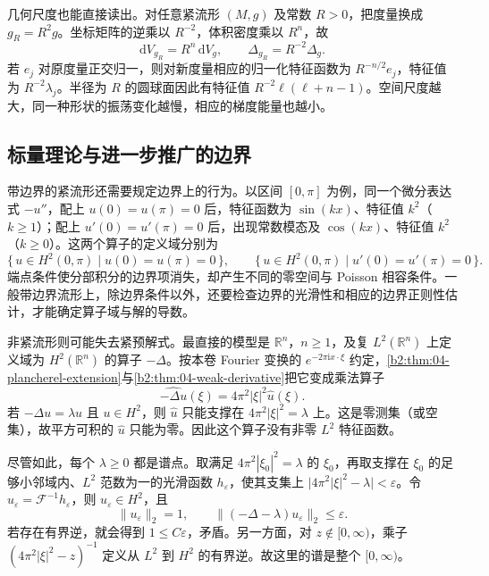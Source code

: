 \ProseParagraphBreak

几何尺度也能直接读出。对任意紧流形 \((M,g)\) 及常数 \(R>0\)，把度量换成 \(g_R=R^2g\)。坐标矩阵的逆乘以 \(R^{-2}\)，体积密度乘以 \(R^n\)，故
\[
 \mathrm dV_{g_R}=R^n\,\mathrm dV_g,\qquad
 \Delta_{g_R}=R^{-2}\Delta_g.
\]
若 \(e_j\) 对原度量正交归一，则对新度量相应的归一化特征函数为 \(R^{-n/2}e_j\)，特征值为 \(R^{-2}\lambda_j\)。半径为 \(R\) 的圆球面因此有特征值 \(R^{-2}\ell(\ell+n-1)\)。空间尺度越大，同一种形状的振荡变化越慢，相应的梯度能量也越小。

\subsection{标量理论与进一步推广的边界}
\label{b2:subsec:260603}

带边界的紧流形还需要规定边界上的行为。以区间 \([0,\pi]\) 为例，同一个微分表达式 \(-u''\)，配上 \(u(0)=u(\pi)=0\) 后，特征函数为 \(\sin(kx)\)、特征值 \(k^2\)（\(k\geq1\)）；配上 \(u'(0)=u'(\pi)=0\) 后，出现常数模态及 \(\cos(kx)\)、特征值 \(k^2\)（\(k\geq0\)）。这两个算子的定义域分别为
\[
 \{\,u\in H^2(0,\pi)\mid u(0)=u(\pi)=0\,\},\qquad
 \{\,u\in H^2(0,\pi)\mid u'(0)=u'(\pi)=0\,\}.
\]
端点条件使分部积分的边界项消失，却产生不同的零空间与 Poisson 相容条件。一般带边界流形上，除边界条件以外，还要检查边界的光滑性和相应的边界正则性估计，才能确定算子域与解的导数。

\ProseParagraphBreak

非紧流形则可能失去紧预解式。最直接的模型是 \(\mathbb R^n\)，\(n\geq1\)，及复 \(L^2(\mathbb R^n)\) 上定义域为 \(H^2(\mathbb R^n)\) 的算子 \(-\Delta\)。按本卷 Fourier 变换的 \(e^{-2\pi\mathrm ix\cdot\xi}\) 约定，\cref{b2:thm:04-plancherel-extension}与\cref{b2:thm:04-weak-derivative}把它变成乘法算子
\[
 \widehat{-\Delta u}(\xi)=4\pi^2|\xi|^2\widehat u(\xi).
\]
若 \(-\Delta u=\lambda u\) 且 \(u\in H^2\)，则 \(\widehat u\) 只能支撑在 \(4\pi^2|\xi|^2=\lambda\) 上。这是零测集（或空集），故平方可积的 \(\widehat u\) 只能为零。因此这个算子没有非零 \(L^2\) 特征函数。

\ProseParagraphBreak

尽管如此，每个 \(\lambda\geq0\) 都是谱点。取满足 \(4\pi^2|\xi_0|^2=\lambda\) 的 \(\xi_0\)，再取支撑在 \(\xi_0\) 的足够小邻域内、\(L^2\) 范数为一的光滑函数 \(h_\varepsilon\)，使其支集上
\(\bigl|4\pi^2|\xi|^2-\lambda\bigr|<\varepsilon\)。令 \(u_\varepsilon=\mathcal F^{-1}h_\varepsilon\)，则 \(u_\varepsilon\in H^2\)，且
\[
 \|u_\varepsilon\|_2=1,\qquad
 \|(-\Delta-\lambda)u_\varepsilon\|_2\leq\varepsilon.
\]
若存在有界逆，就会得到 \(1\leq C\varepsilon\)，矛盾。另一方面，对 \(z\notin[0,\infty)\)，乘子 \((4\pi^2|\xi|^2-z)^{-1}\) 定义从 \(L^2\) 到 \(H^2\) 的有界逆。故这里的谱是整个 \([0,\infty)\)。

